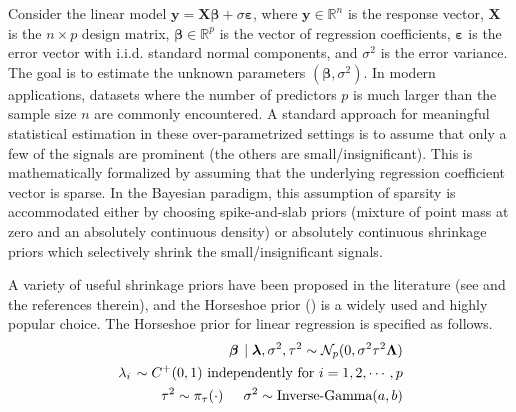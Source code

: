 \documentclass[noinfoline,11pt]{imsart}
\numberwithin{equation}{section}
\theoremstyle{plain}
\newcommand{\y}{\mathbf{y}}
\newcommand{\X}{\mathbf{X}}
\newcommand{\bb}{\boldsymbol{\beta}}
\newcommand{\ep}{\boldsymbol{\varepsilon}}
\newcommand{\bl}{\boldsymbol{\lambda}}
\newcommand{\Bl}{\boldsymbol{\Lambda}}
\begin{document}
\noindent
Consider the linear model $\y = \X \bb + \sigma \ep$, where $\y \in 
\mathbb{R}^n$ is the response vector, $\X$ is the $n \times p$ design matrix, $\bb \in \mathbb{R}^p$ is the vector of regression coefficients, $\ep$ is the error vector with i.i.d. standard normal components, and $\sigma^2$ is the error variance. The goal is to estimate the unknown parameters $(\bb, \sigma^2)$. In modern applications, datasets where the number of predictors $p$ is much larger than the sample size $n$ are commonly encountered. A standard approach for meaningful statistical estimation in these over-parametrized settings is to assume that only a few of the signals are prominent (the others are small/insignificant). This is mathematically formalized by assuming that the underlying regression coefficient vector is sparse. In the Bayesian paradigm, this assumption of sparsity is accommodated either by choosing spike-and-slab priors (mixture of point mass at zero and an absolutely continuous density) or absolutely continuous shrinkage priors which selectively shrink the small/insignificant signals. 

A variety of useful shrinkage priors have been proposed in the literature (see \cite{BPPD:2015, 10.2307/25734098, Polsonandscott2012} and the references therein), and the Horseshoe prior  (\cite{10.2307/25734098}) is a widely used and highly popular choice. The Horseshoe prior for linear regression is specified as follows. 
\begin{eqnarray}
\left.\bb \right. \mid \bl, \sigma^2,\tau^2\sim \mathcal{N}_p(0,\sigma^2\tau^2 \Bl) \nonumber\\
\left.\lambda_i\right.\sim C^+ (0,1) \text{ independently for}\ i=1,2,\cdots,p \nonumber\\
\tau^2\sim \pi_\tau (\cdot) \hspace{0.2in} \sigma^2\sim 
\text{Inverse-Gamma}(a,b) \label{horseshoe_prior}
\end{eqnarray}

\end{document}
